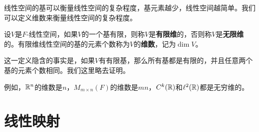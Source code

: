 线性空间的基可以衡量线性空间的复杂程度，基元素越少，线性空间越简单。我们可以定义维数来衡量线性空间的复杂程度。

\begin{definition}[维数]
设$V$是$F$-线性空间，如果$V$的一个基有限，则称$V$是\textbf{有限维}的，否则称$V$是\textbf{无限维}的。有限维线性空间的基的元素个数称为$V$的\textbf{维数}，记为$\dim V$。
\end{definition}
这一定义隐含的事实是，如果$V$有有限基，那么所有基都是有限的，并且任意两个基的元素个数相同。我们这里略去证明。

例如，$\mathbb{R}^n$的维数是$n$，$M_{m\times n}(F)$的维数是$mn$，$C^k(\mathbb{R})$和$\ell^2(\mathbb{R})$都是无穷维的。

\section{线性映射}